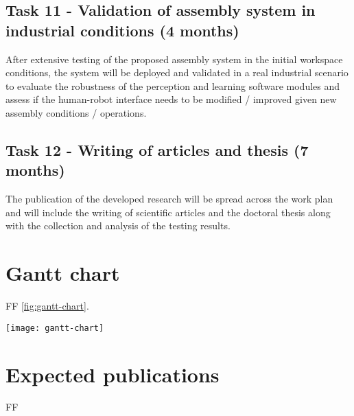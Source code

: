 \subsection{Task 11 - Validation of assembly system in industrial conditions (4 months)}

After extensive testing of the proposed assembly system in the initial workspace conditions, the system will be deployed and validated in a real industrial scenario to evaluate the robustness of the perception and learning software modules and assess if the human-robot interface needs to be modified / improved given new assembly conditions / operations.


\subsection{Task 12 - Writing of articles and thesis (7 months)}

The publication of the developed research will be spread across the work plan and will include the writing of scientific articles and the doctoral thesis along with the collection and analysis of the testing results.



\section{Gantt chart}

FF \cref{fig:gantt-chart}.

\begin{sidewaysfigure}
	\centering
	\texttt{[image: gantt-chart]}
	\caption{Gantt chart with main tasks and milestones}
	\label{fig:gantt-chart}
\end{sidewaysfigure}



\section{Expected publications}

FF

